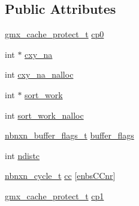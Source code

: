 \subsection*{\-Public \-Attributes}
\begin{DoxyCompactItemize}
\item 
\hyperlink{structgmx__cache__protect__t}{gmx\-\_\-cache\-\_\-protect\-\_\-t} \hyperlink{structnbnxn__search__work__t_a544027c7cb7a5f5e61949758176eb636}{cp0}
\item 
int $\ast$ \hyperlink{structnbnxn__search__work__t_ae025662821071a059e83633100e5ef8a}{cxy\-\_\-na}
\item 
int \hyperlink{structnbnxn__search__work__t_aaf72fa39ee40f2a936637a6b90769fbd}{cxy\-\_\-na\-\_\-nalloc}
\item 
int $\ast$ \hyperlink{structnbnxn__search__work__t_aff6170bb2c18646132607f267a84d058}{sort\-\_\-work}
\item 
int \hyperlink{structnbnxn__search__work__t_a3fc4c46a5b20300a7b844b46aa7ddb81}{sort\-\_\-work\-\_\-nalloc}
\item 
\hyperlink{structnbnxn__buffer__flags__t}{nbnxn\-\_\-buffer\-\_\-flags\-\_\-t} \hyperlink{structnbnxn__search__work__t_a135ff25eccc95fc6ea29d6ccb50a6d98}{buffer\-\_\-flags}
\item 
int \hyperlink{structnbnxn__search__work__t_a3c089ca182a3bba8aa4f741db3f6761f}{ndistc}
\item 
\hyperlink{structnbnxn__cycle__t}{nbnxn\-\_\-cycle\-\_\-t} \hyperlink{structnbnxn__search__work__t_a7fa3a443cef962973d7f5716946e620e}{cc} \mbox{[}\hyperlink{nbnxn__internal_8h_a573f0cc5fc240fb29edcf79155e5a542ad6389749e41e9655adbeaca11f282d8b}{enbs\-C\-Cnr}\mbox{]}
\item 
\hyperlink{structgmx__cache__protect__t}{gmx\-\_\-cache\-\_\-protect\-\_\-t} \hyperlink{structnbnxn__search__work__t_a0ace6a38393c4a0181dafbc95ca8bf4a}{cp1}
\end{DoxyCompactItemize}


